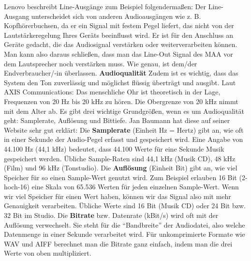 \documentclass[11pt, twoside]{article}
\begin{document}
Lenovo beschreibt Line-Ausgänge zum Beispiel folgendermaßen: \glqq Der Line-Ausgang unterscheidet sich von anderen Audioausgängen wie z. B. Kopfhörerbuchsen, da er ein Signal mit festem Pegel liefert, das nicht von der Lautstärkeregelung Ihres Geräts beeinflusst wird. Er ist für den Anschluss an Geräte gedacht, die das Audiosignal verstärken oder weiterverarbeiten können.\grqq{} \parencite{noauthor_urlnl02_nodate} \newline
Man kann also daraus schließen, dass man das Line-Out Signal des MAA vor dem Lautsprecher noch verstärken muss. Wie genau, ist dem/der Endverbraucher/-in überlassen. \parencite[vgl.][]{noauthor_urlnl02_nodate}
\vspace{4mm}\newline
\textbf{Audioqualität}\newline
Zudem ist es wichtig, dass das System den Ton zuverlässig und möglichst flüssig überträgt und ausgibt.\newline
Laut AXIS Communications: \glqq Das menschliche Ohr ist theoretisch in der Lage, Frequenzen von 20 Hz bis 20 kHz zu hören. Die
Obergrenze von 20 kHz nimmt mit dem Alter ab.\grqq{} \parencite{noauthor_urlnl03_nodate} \newline
Es gibt drei wichtige Grundgrößen, wenn es um Audioqualität geht: Samplerate, Auflösung und Bittiefe.\newline
Jan Baumann hat diese auf seiner Website sehr gut erklärt:
\vspace{4mm}\newline
\glqq Die \textbf{Samplerate} (Einheit Hz = Hertz) gibt an, wie oft in einer Sekunde der Audio-Pegel erfasst und gespeichert wird. Eine Angabe von 44.100 Hz (44,1 kHz) bedeutet, dass 44.100 Werte für eine Sekunde Musik gespeichert werden. Übliche Sample-Raten sind 44,1 kHz (Musik CD), 48 kHz (Film) und 96 kHz (Tonstudio).\grqq{} \parencite{noauthor_urlnl04_nodate}
\vspace{4mm}\newline
\glqq Die \textbf{Auflösung} (Einheit Bit) gibt an, wie viel Speicher für so einen Sample-Wert genutzt wird. Zum Beispiel erlauben 16 Bit (2-hoch-16) eine Skala von 65.536 Werten für jeden einzelnen Sample-Wert. Wenn wir viel Speicher für einen Wert haben, können wir das Signal also mit mehr Genauigkeit verarbeiten. Übliche Werte sind 16 Bit (Musik CD) oder 24 Bit bzw. 32 Bit im Studio.\grqq{}  \parencite{noauthor_urlnl04_nodate}
\vspace{4mm}\newline 
\glqq Die \textbf{Bitrate} bzw. Datenrate (kBit/s) wird oft mit der Auflösung verwechselt. Sie steht für die “Bandbreite” der Audiodatei, also welche Datenmenge in einer Sekunde verarbeitet wird. Für unkomprimierte Formate wie WAV und AIFF berechnet man die Bitrate ganz einfach, indem man die drei Werte von oben multipliziert.\grqq{} \parencite{noauthor_urlnl04_nodate}\newline
\end{document}
